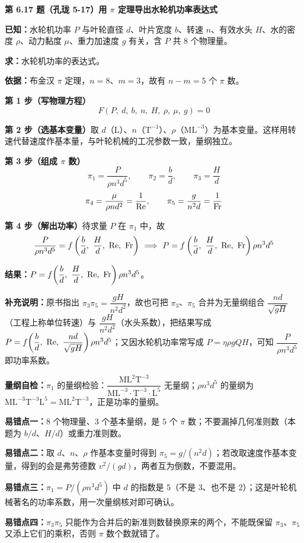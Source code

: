 \noindent\textbf{第 6.17 题（孔珑 5-17）\quad 用 $\pi$ 定理导出水轮机功率表达式}

\begin{jie}
\textbf{已知：}水轮机功率 $P$ 与叶轮直径 $d$、叶片宽度 $b$、转速 $n$、有效水头 $H$、水的密度 $\rho$、动力黏度 $\mu$、重力加速度 $g$ 有关，含 $P$ 共 8 个物理量。

\textbf{求：}水轮机功率的表达式。

\textbf{依据：}布金汉 $\pi$ 定理，$n=8$、$m=3$，故有 $n-m=5$ 个 $\pi$ 数。

\textbf{第 1 步（写物理方程）}\quad
\[F\left(P,\ d,\ b,\ n,\ H,\ \rho,\ \mu,\ g\right)=0\]

\textbf{第 2 步（选基本变量）}\quad 取 $d$（$\mathrm{L}$）、$n$（$\mathrm{T^{-1}}$）、$\rho$（$\mathrm{ML^{-3}}$）为基本变量。这样用转速代替速度作基本量，与叶轮机械的工况参数一致，量纲独立。

\textbf{第 3 步（组成 $\pi$ 数）}\quad
\[\pi_1=\frac{P}{\rho n^{3}d^{5}},\qquad \pi_2=\frac{b}{d},\qquad \pi_3=\frac{H}{d}\]
\[\pi_4=\frac{\mu}{\rho nd^{2}}=\frac{1}{\mathrm{Re}},\qquad \pi_5=\frac{g}{n^{2}d}=\frac{1}{\mathrm{Fr}}\]

\textbf{第 4 步（解出功率）}\quad 待求量 $P$ 在 $\pi_1$ 中，故
\[\frac{P}{\rho n^{3}d^{5}}=f\left(\frac{b}{d},\ \frac{H}{d},\ \Rey,\ \Fr\right)\ \Longrightarrow\ P=f\left(\frac{b}{d},\ \frac{H}{d},\ \Rey,\ \Fr\right)\rho n^{3}d^{5}\]

\textbf{结果：}$P=f\!\left(\dfrac{b}{d},\ \dfrac{H}{d},\ \Rey,\ \Fr\right)\rho n^{3}d^{5}$。

\textbf{补充说明：}原书指出 $\pi_3\pi_5=\dfrac{gH}{n^{2}d^{2}}$，故也可把 $\pi_3$、$\pi_5$ 合并为无量纲组合 $\dfrac{nd}{\sqrt{gH}}$（工程上称单位转速）与 $\dfrac{gH}{n^{2}d^{2}}$（水头系数），把结果写成 $P=f\!\left(\dfrac{b}{d},\ \Rey,\ \dfrac{nd}{\sqrt{gH}}\right)\rho n^{3}d^{5}$；又因水轮机功率常写成 $P=\eta\rho gQH$，可知 $\dfrac{P}{\rho n^{3}d^{5}}$ 即功率系数。

\textbf{量纲自检：}$\pi_1$ 的量纲检验：$\dfrac{\mathrm{ML^{2}T^{-3}}}{\mathrm{ML^{-3}}\cdot\mathrm{T^{-3}}\cdot\mathrm{L^{5}}}$ 无量纲；$\rho n^{3}d^{5}$ 的量纲为 $\mathrm{ML^{-3}T^{-3}L^{5}}=\mathrm{ML^{2}T^{-3}}$，正是功率的量纲。
\end{jie}

\begin{yicuo}
\textbf{易错点一：}$8$ 个物理量、$3$ 个基本量纲，是 $5$ 个 $\pi$ 数；不要漏掉几何准则数（本题为 $b/d$、$H/d$）或重力准则数。

\textbf{易错点二：}取 $d$、$n$、$\rho$ 作基本变量时得到 $\pi_5=g/(n^{2}d)$；若改取速度作基本变量，得到的会是弗劳德数 $v^{2}/(gd)$，两者互为倒数，不要混用。

\textbf{易错点三：}$\pi_1=P/(\rho n^{3}d^{5})$ 中 $d$ 的指数是 $5$（不是 $3$、也不是 $2$）；这是叶轮机械著名的功率系数，用一次量纲核对即可确认。

\textbf{易错点四：}$\pi_3\pi_5$ 只能作为合并后的新准则数替换原来的两个，不能既保留 $\pi_3$、$\pi_5$ 又添上它们的乘积，否则 $\pi$ 数个数就错了。
\end{yicuo}

